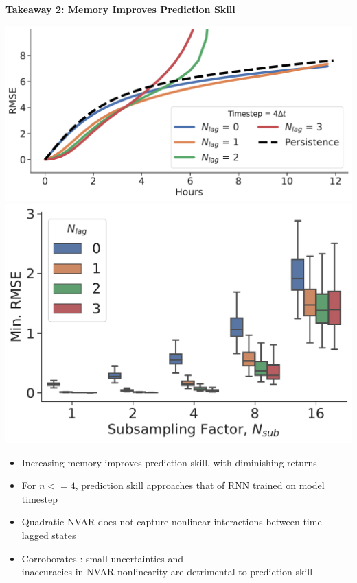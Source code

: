 \vspace{2em}
\begin{tcolorbox}[width=\textwidth,
    colframe=sapphire,
    colback=white,
    arc=24pt,
    boxrule=5pt,
    boxsep=0.5em]


   \begin{minipage}{\textwidth}
       \centering
       \textbf{Takeaway 2: Memory Improves Prediction Skill}
   \end{minipage}
   \vspace{1em}

    \begin{minipage}{\textwidth}
        \centering
        \includegraphics[width=.49\textwidth,
            trim={0, -2em, 0, 0}, clip]{../../figures/nvar-rmse-vs-lag-04sub.pdf}
        \includegraphics[width=.49\textwidth]{../../figures/nvar-mrmse-vs-lag-050samples.pdf}
    \end{minipage}

    \vspace{1.5em}
    \begin{minipage}{\textwidth}
        \begin{itemize}
            \item Increasing memory improves prediction skill, with diminishing returns
            \item For $n<=4$, prediction skill
                approaches that of RNN trained on model timestep
            \item Quadratic NVAR does not capture nonlinear
                interactions between time-lagged states
            \item Corroborates \cite{zhang_catch-22_2022}: small
                uncertainties and\\inaccuracies in NVAR nonlinearity are
                detrimental to prediction skill
        \end{itemize}
    \end{minipage}
\end{tcolorbox}
